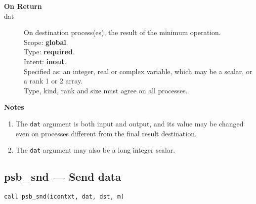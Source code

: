 \begin{description}
\item[\bf On Return]
\item[dat] On destination process(es), the result of the minimum operation.\\
Scope: {\bf global}.\\
Type: {\bf required}.\\
Intent: {\bf inout}.\\
Specified as: an integer, real or complex variable, which may be a
scalar, or a rank 1 or 2 array. \\
Type, kind, rank and size must agree on all processes.
\end{description}


{\par\noindent\large\bfseries Notes}
\begin{enumerate}
\item The \verb|dat| argument is both input and output, and its
  value may be changed even on processes different from the final
  result destination.
\item The \verb|dat| argument may also be a long integer scalar.
\end{enumerate}


\clearpage\subsection*{psb\_snd --- Send data}

\begin{verbatim}
call psb_snd(icontxt, dat, dst, m)
\end{verbatim}

